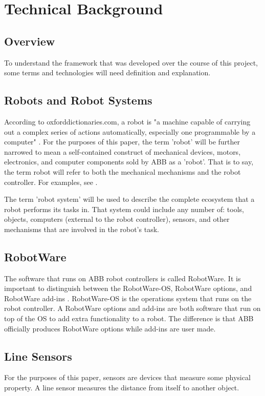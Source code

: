 \documentclass{cslthse-msc}
\begin{document}
\chapter{Technical Background}
\label{sec:Tech_Back}

\section{Overview}
\label{sec:Tech_Back:Overview}
To understand the framework that was developed over the course of this project, some terms and technologies will need definition and explanation.



\section{Robots and Robot Systems}
\label{sec:Tech_Back:Rob_Syst}
According to oxforddictionaries.com, a robot is "a machine capable of carrying out a complex series of actions automatically, especially one programmable by a computer" \cite{Def:Robot}. For the purposes of this paper, the term 'robot' will be further narrowed to mean a self-contained construct of mechanical devices, motors, electronics, and computer components sold by ABB as a 'robot'. That is to say, the term robot will refer to both the mechanical mechanisms and the robot controller. For examples, see \cite{ABB:Products}. \par
The term 'robot system' will be used to describe the complete ecosystem that a robot performs its tasks in. That system could include any number of: tools, objects, computers (external to the robot controller), sensors, and other mechanisms that are involved in the robot's task. 

\section{RobotWare}
\label{sec:Tech_Back:RobotWare}
The software that runs on ABB robot controllers is called RobotWare. It is important to distinguish between the RobotWare-OS, RobotWare options, and RobotWare add-ins \cite[Sec. 1]{ABB:controller_software}. RobotWare-OS is the operations system that runs on the robot controller. A RobotWare options and add-ins are both software that run on top of the OS to add extra functionality to a robot. The difference is that ABB officially produces RobotWare options while add-ins are user made. 

\section{Line Sensors}
\label{sec:Tech_Back:Line_Sensors}
For the purposes of this paper, sensors are devices that measure some physical property. A line sensor measures the distance from itself to another object. 
\end{document}
